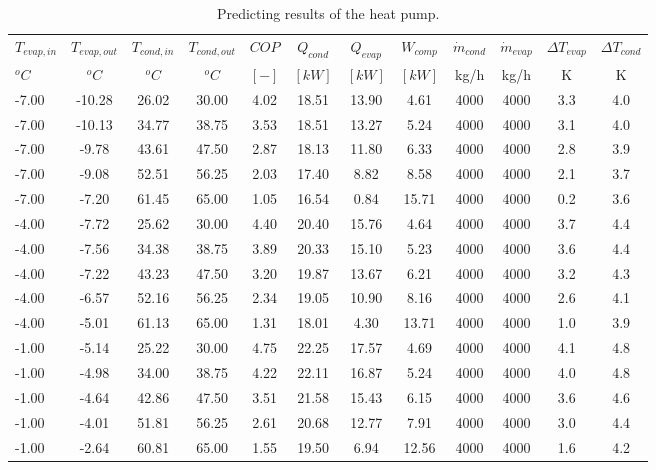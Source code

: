 \documentclass[english]{SPFShortReport}
\begin{document}
\begin{table}[!ht]
\begin{small}
\caption{Predicting results of the heat pump.}
\begin{center}
\resizebox{12cm}{!} 
{
\begin{tabular}{l | c c c c c c c c c c c } 
\hline
\hline
$T_{evap,in}$ &$T_{evap,out}$ &$T_{cond,in}$ &$T_{cond,out}$ &$COP$ &$Q_{cond}$ &$Q_{evap}$ &$W_{comp}$ &$\dot m_{cond}$ &$\dot m_{evap}$ &$\Delta T_{evap}$ &$\Delta T_{cond}$ \\ 
$^oC$ &$^oC$ &$^oC$ &$^oC$ &$[-]$ &$[kW]$ &$[kW]$ &$[kW]$ &kg/h &kg/h &K &K\\ 
\hline
-7.00 & -10.28 & 26.02 & 30.00 & 4.02 & 18.51 & 13.90 & 4.61 & 4000 & 4000 & 3.3 & 4.0\\ 
-7.00 & -10.13 & 34.77 & 38.75 & 3.53 & 18.51 & 13.27 & 5.24 & 4000 & 4000 & 3.1 & 4.0\\ 
-7.00 & -9.78 & 43.61 & 47.50 & 2.87 & 18.13 & 11.80 & 6.33 & 4000 & 4000 & 2.8 & 3.9\\ 
-7.00 & -9.08 & 52.51 & 56.25 & 2.03 & 17.40 & 8.82 & 8.58 & 4000 & 4000 & 2.1 & 3.7\\ 
-7.00 & -7.20 & 61.45 & 65.00 & 1.05 & 16.54 & 0.84 & 15.71 & 4000 & 4000 & 0.2 & 3.6\\ 
-4.00 & -7.72 & 25.62 & 30.00 & 4.40 & 20.40 & 15.76 & 4.64 & 4000 & 4000 & 3.7 & 4.4\\ 
-4.00 & -7.56 & 34.38 & 38.75 & 3.89 & 20.33 & 15.10 & 5.23 & 4000 & 4000 & 3.6 & 4.4\\ 
-4.00 & -7.22 & 43.23 & 47.50 & 3.20 & 19.87 & 13.67 & 6.21 & 4000 & 4000 & 3.2 & 4.3\\ 
-4.00 & -6.57 & 52.16 & 56.25 & 2.34 & 19.05 & 10.90 & 8.16 & 4000 & 4000 & 2.6 & 4.1\\ 
-4.00 & -5.01 & 61.13 & 65.00 & 1.31 & 18.01 & 4.30 & 13.71 & 4000 & 4000 & 1.0 & 3.9\\ 
-1.00 & -5.14 & 25.22 & 30.00 & 4.75 & 22.25 & 17.57 & 4.69 & 4000 & 4000 & 4.1 & 4.8\\ 
-1.00 & -4.98 & 34.00 & 38.75 & 4.22 & 22.11 & 16.87 & 5.24 & 4000 & 4000 & 4.0 & 4.8\\ 
-1.00 & -4.64 & 42.86 & 47.50 & 3.51 & 21.58 & 15.43 & 6.15 & 4000 & 4000 & 3.6 & 4.6\\ 
-1.00 & -4.01 & 51.81 & 56.25 & 2.61 & 20.68 & 12.77 & 7.91 & 4000 & 4000 & 3.0 & 4.4\\ 
-1.00 & -2.64 & 60.81 & 65.00 & 1.55 & 19.50 & 6.94 & 12.56 & 4000 & 4000 & 1.6 & 4.2\\ 

\end{tabular}}
\end{center}
\end{small}
\end{table}
\end{document}
